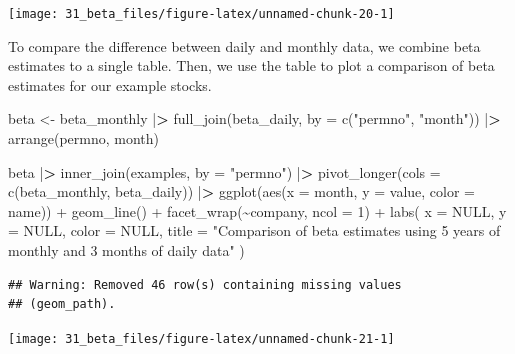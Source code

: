 \documentclass[
]{book}
\newenvironment{Shaded}{\begin{snugshade}}{\end{snugshade}}
\newcommand{\AttributeTok}[1]{\textcolor[rgb]{0.61,0.61,0.61}{#1}}
\newcommand{\ConstantTok}[1]{\textcolor[rgb]{0,0,0}{#1}}
\newcommand{\DecValTok}[1]{\textcolor[rgb]{0.06,0.06,0.06}{#1}}
\newcommand{\ErrorTok}[1]{\textcolor[rgb]{0.14,0.14,0.14}{\textbf{#1}}}
\newcommand{\FunctionTok}[1]{\textcolor[rgb]{0,0,0}{#1}}
\newcommand{\NormalTok}[1]{#1}
\newcommand{\OtherTok}[1]{\textcolor[rgb]{0.37,0.37,0.37}{#1}}
\newcommand{\SpecialCharTok}[1]{\textcolor[rgb]{0,0,0}{#1}}
\newcommand{\StringTok}[1]{\textcolor[rgb]{0.5,0.5,0.5}{#1}}
\begin{document}
\begin{center}\texttt{[image: 31\_beta\_files/figure-latex/unnamed-chunk-20-1]} \end{center}

To compare the difference between daily and monthly data, we combine beta estimates to a single table. Then, we use the table to plot a comparison of beta estimates for our example stocks.

\begin{Shaded}
\begin{Highlighting}[]
\NormalTok{beta }\OtherTok{\textless{}{-}}\NormalTok{ beta\_monthly }\SpecialCharTok{|}\ErrorTok{\textgreater{}}
  \FunctionTok{full\_join}\NormalTok{(beta\_daily, }\AttributeTok{by =} \FunctionTok{c}\NormalTok{(}\StringTok{"permno"}\NormalTok{, }\StringTok{"month"}\NormalTok{)) }\SpecialCharTok{|}\ErrorTok{\textgreater{}}
  \FunctionTok{arrange}\NormalTok{(permno, month)}

\NormalTok{beta }\SpecialCharTok{|}\ErrorTok{\textgreater{}}
  \FunctionTok{inner\_join}\NormalTok{(examples, }\AttributeTok{by =} \StringTok{"permno"}\NormalTok{) }\SpecialCharTok{|}\ErrorTok{\textgreater{}}
  \FunctionTok{pivot\_longer}\NormalTok{(}\AttributeTok{cols =} \FunctionTok{c}\NormalTok{(beta\_monthly, beta\_daily)) }\SpecialCharTok{|}\ErrorTok{\textgreater{}}
  \FunctionTok{ggplot}\NormalTok{(}\FunctionTok{aes}\NormalTok{(}\AttributeTok{x =}\NormalTok{ month, }\AttributeTok{y =}\NormalTok{ value, }\AttributeTok{color =}\NormalTok{ name)) }\SpecialCharTok{+}
  \FunctionTok{geom\_line}\NormalTok{() }\SpecialCharTok{+}
  \FunctionTok{facet\_wrap}\NormalTok{(}\SpecialCharTok{\textasciitilde{}}\NormalTok{company, }\AttributeTok{ncol =} \DecValTok{1}\NormalTok{) }\SpecialCharTok{+}
  \FunctionTok{labs}\NormalTok{(}
    \AttributeTok{x =} \ConstantTok{NULL}\NormalTok{, }\AttributeTok{y =} \ConstantTok{NULL}\NormalTok{, }\AttributeTok{color =} \ConstantTok{NULL}\NormalTok{,}
    \AttributeTok{title =} \StringTok{"Comparison of beta estimates using 5 years of monthly and 3 months of daily data"}
\NormalTok{  )}
\end{Highlighting}
\end{Shaded}

\begin{verbatim}
## Warning: Removed 46 row(s) containing missing values
## (geom_path).
\end{verbatim}

\begin{center}\texttt{[image: 31\_beta\_files/figure-latex/unnamed-chunk-21-1]} \end{center}
\end{document}
